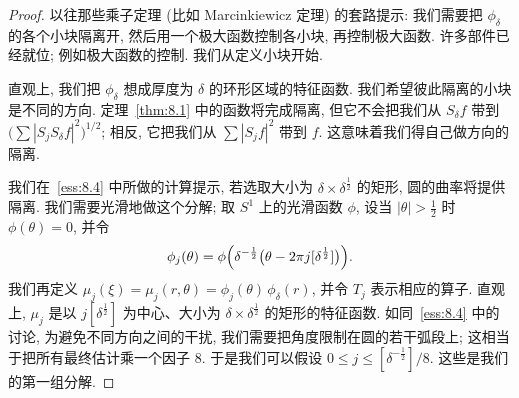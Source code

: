\begin{proof}
以往那些乘子定理 (比如 Marcinkiewicz 定理) 的套路提示: 我们需要把 $\phi_{\delta}$ 的各个小块隔离开, 然后用一个极大函数控制各小块, 再控制极大函数. 许多部件已经就位; 例如极大函数的控制. 我们从定义小块开始.

直观上, 我们把 $\phi_\delta$ 想成厚度为 $\delta$ 的环形区域的特征函数. 我们希望彼此隔离的小块是不同的方向. 定理~\ref{thm:8.1} 中的函数将完成隔离, 但它不会把我们从 $S_\delta f$ 带到 $\bigl(\sum|S_jS_\delta f|^2\bigr)^{1/2}$; 相反, 它把我们从 $\sum|S_jf|^2$ 带到 $f$. 这意味着我们得自己做方向的隔离.

我们在~\ref*{ess:8.4} 中所做的计算提示, 若选取大小为 $\delta\times\delta^{\frac{1}{2}}$ 的矩形, 圆的曲率将提供隔离. 我们需要光滑地做这个分解; 取 $S^1$ 上的光滑函数 $\phi$, 设当 $|\theta|>\frac{1}{2}$ 时 $\phi(\theta)=0$, 并令
\[
\phi_{j}(\theta)=\phi\Bigl(\delta^{-\frac{1}{2}}\bigl(\theta-2\pi j[\delta^{\frac{1}{2}}]\bigr)\Bigr).
\]
我们再定义 $\mu_j(\xi)=\mu_j(r,\theta)=\phi_j(\theta)\,\phi_\delta(r)$, 并令 $T_j$ 表示相应的算子. 直观上, $\mu_j$ 是以 $j[\delta^{\frac{1}{2}}]$ 为中心、大小为 $\delta\times\delta^{\frac{1}{2}}$ 的矩形的特征函数. 如同~\ref*{ess:8.4} 中的讨论, 为避免不同方向之间的干扰, 我们需要把角度限制在圆的若干弧段上; 这相当于把所有最终估计乘一个因子 $8$. 于是我们可以假设 $0\leq j\leq[\delta^{-\frac{1}{2}}]/8$. 这些是我们的第一组分解.


\end{proof}
